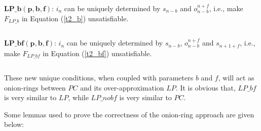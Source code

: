 \documentclass[journal]{IEEEtran}
\begin{document}
\begin{equation}\label{t2_f}
\end{equation}

\textbf{$\boldsymbol{LP\_b(p,b,f)}$}:
$i_n$ can be uniquely determined by $s_{n-b}$ and $o_{n-b}^{n+f}$,
i.e.,
make $F_{LP\_b}$ in Equation (\ref{t2_b}) unsatisfiable.


\begin{equation}\label{t2_b}
\end{equation}


\textbf{$\boldsymbol{LP\_bf(p,b,f)}$}:
$i_n$ can be uniquely determined by $s_{n-b}$, $o_{n-b}^{n+f}$ and $s_{n+1+f}$,
i.e.,
make $F_{LP\_bf}$ in Equation (\ref{t2_bf}) unsatisfiable.

\begin{equation}\label{t2_bf}
\end{equation}

These new unique conditions,
when coupled with parameters $b$ and $f$,
will act as onion-rings between $PC$ and its over-approximation $LP$.
It is obvious that,
$LP\_bf$ is very similar to $LP$,
while $LP\_nobf$ is very similar to $PC$.

Some lemmas used to prove the correctness of the onion-ring approach are given below:
\end{document}
